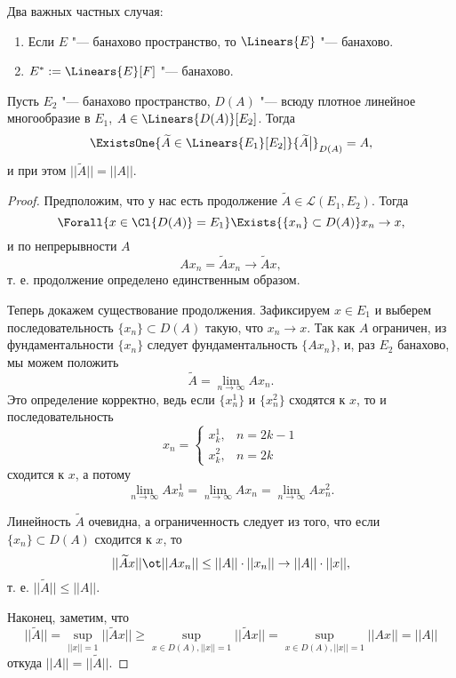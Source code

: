 \documentclass[main]{subfiles}
\begin{document}
\begin{corollary}
  Два важных частных случая:
  \begin{enumerate}
    \item Если \( E \) "--- банахово пространство, то \( \Linears{E} \) "---
      банахово.
    \item  \( E^* := \Linears{E}[F] \) "--- банахово.
  \end{enumerate}
\end{corollary}

\begin{theorem}\label{thm:operator-continuation}
  Пусть \( E_2 \) "--- банахово пространство,
  \( D(A) \) "--- всюду плотное линейное многообразие
  в \( E_1 \), \( A \in \Linears{D(A)}[E_2] \).
  Тогда 
  \[
    \ExistsOne{\widetilde{A} \in \Linears{E_1}[E_2]}
    {\widetilde{A} \bigr|}_{D(A)} = A,
  \]
  и при этом \( ||\widetilde{A}|| = ||A|| \).
\end{theorem}
\begin{proof}
  Предположим, что у нас есть продолжение
  \( \widetilde{A} \in \mathcal{L}(E_1, E_2) \).
  Тогда
  \[
    \Forall{x \in \Cl{D(A)} = E_1}
    \Exists{ \{ x_n \} \subset D(A) }
    x_n \to x,
  \]
  и по непрерывности \( A \)
  \[
    A x_n = \widetilde{A} x_n \to \widetilde{A} x,
  \]
  т. е. продолжение определено единственным образом.

  Теперь докажем существование продолжения.
  Зафиксируем \( x \in E_1 \) и выберем
  последовательность \( \{ x_n \} \subset D(A) \)
  такую, что \( x_n \to x \).
  Так как \( A \) ограничен, из фундаментальности
  \( \{ x_n \} \) следует фундаментальность
  \( \{ A x_n \} \), и, раз \( E_2 \) банахово,
  мы можем положить
  \[
    \widetilde{A} = \lim_{n \to \infty} A x_n.
  \]
  Это определение корректно, ведь если
  \( \{ x^1_n \} \) и \( \{ x^2_n \} \)
  сходятся к \( x \), то
  и последовательность
  \[
    x_n = \begin{cases}
      x^1_k, & n = 2k - 1 \\
      x^2_k, & n = 2k
    \end{cases}
  \]
  сходится к \( x \), а потому
  \[
    \lim_{n \to \infty} A x^1_n =
    \lim_{n \to \infty} A x_n = 
    \lim_{n \to \infty} A x^2_n.
  \]

  Линейность \( \widetilde{A} \) очевидна,
  а ограниченность следует из того,
  что если \( \{ x_n \} \subset D(A) \)
  сходится к \( x \),
  то
  \[
    ||\widetilde{A} x|| \ot
    ||A x_n|| \le
    ||A|| \cdot ||x_n|| \to
    ||A|| \cdot ||x||,
  \]
  т. е. \( ||\widetilde{A}|| \le ||A|| \).

  Наконец, заметим, что
  \[
    ||\widetilde{A}|| =
    \sup_{||x|| = 1} ||\widetilde{A} x|| \ge
    \sup_{x \in D(A), ||x|| = 1} ||\widetilde{A} x|| =
    \sup_{x \in D(A), ||x|| = 1} ||A x|| =
    ||A||
  \]
  откуда \( ||A|| = ||\widetilde{A}|| \).
\end{proof}
\end{document}
